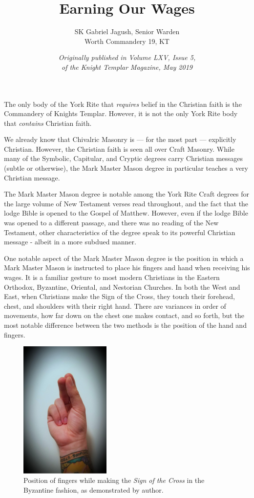 \documentclass[letterpaper,11pt]{article}
\title{Earning Our Wages}
\author{SK Gabriel Jagush, Senior Warden\\Worth Commandery \textnumero{} 19, KT}
\date{\textit{Originally published in Volume LXV, Issue \textnumero{} 5,\\of the Knight Templar Magazine, May 2019}}
\begin{document}
	
	\maketitle
	
	The only body of the York Rite that \textit{requires} belief in the Christian faith is the Commandery of Knights
	Templar. However, it is not the only York Rite body that \textit{contains} Christian faith.
	
	We already know that Chivalric Masonry is --– for the most part –-- explicitly Christian. However, the
	Christian faith is seen all over Craft Masonry. While many of the Symbolic, Capitular, and Cryptic degrees
	carry Christian messages (subtle or otherwise), the Mark Master Mason degree in particular teaches a very
	Christian message.
	
	The Mark Master Mason degree is notable among the York Rite Craft degrees for the large volume of
	New Testament verses read throughout, and the fact that the lodge Bible is opened to the Gospel of
	Matthew. However, even if the lodge Bible was opened to a different passage, and there was no reading of
	the New Testament, other characteristics of the degree speak to its powerful Christian message - albeit in a
	more subdued manner.
	
	One notable aspect of the Mark Master Mason degree is the position in which a Mark Master Mason is instructed to place his fingers and hand when receiving his wages. It is a familiar gesture to most modern Christians in the Eastern Orthodox, Byzantine, Oriental, and Nestorian Churches. In both the West and East, when Christians make the Sign of the Cross, they touch their forehead, chest, and shoulders with their right hand. There are variances in order of movements, how far down on the chest one makes contact, and so forth, but the most notable difference between the two methods is the position of the hand and fingers. 
	
	\pagebreak
	
	\begin{figure}
		\begin{center}
			\includegraphics[width=0.4\textwidth]{MarkMasterHand.png}
			\caption{\small{Position of fingers while making the \textit{Sign of the Cross} in the Byzantine fashion, as demonstrated by author.}}
		\end{center}
	\end{figure}
	
\end{document}

